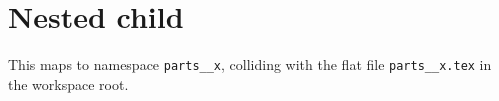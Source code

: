 \section{Nested child}
\label{sec:nested}

This maps to namespace \texttt{parts\_\_x}, colliding with the flat file
\texttt{parts\_\_x.tex} in the workspace root.
